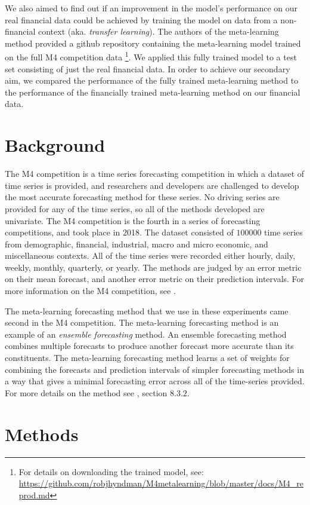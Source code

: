 \documentclass[a4paper,12pt]{article}
\theoremstyle{definition}
\begin{document}
We also aimed to find out if an improvement in the model's performance on our real financial data could be achieved by training the model on data from a non-financial context (aka. \textit{ transfer learning}). The authors of the meta-learning method provided a github repository containing the meta-learning model trained on the full M4 competition data \footnote{For details on downloading the trained model, see: \url{https://github.com/robjhyndman/M4metalearning/blob/master/docs/M4_reprod.md}}. We applied this fully trained model to a test set consisting of just the real financial data. In order to achieve our secondary aim, we compared the performance of the fully trained meta-learning method to the performance of the financially trained meta-learning method on our financial data.

\section{Background}
The M4 competition is a time series forecasting competition in which a dataset of time series is provided, and researchers and developers are challenged to develop the most accurate forecasting method for these series. No driving series are provided for any of the time series, so all of the methods developed are univariate. The M4 competition is the fourth in a series of forecasting competitions, and took place in 2018. The dataset consisted of $100000$ time series from demographic, financial, industrial, macro and micro economic, and miscellaneous contexts. All of the time series were recorded either hourly, daily, weekly, monthly, quarterly, or yearly. The methods are judged by an error metric on their mean forecast, and another error metric on their prediction intervals. For more information on the M4 competition, see \cite{m4}.

The meta-learning forecasting method that we use in these experiments came second in the M4 competition. The meta-learning forecasting method is an example of an \textit{ensemble forecasting} method. An ensemble forecasting method combines multiple forecasts to produce another forecast more accurate than its constituents. The meta-learning forecasting method learns a set of weights for combining the forecasts and prediction intervals of simpler forecasting methods in a way that gives a minimal forecasting error across all of the time-series provided. For more details on the method see \cite{lit}, section $8.3.2$.

\section{Methods}
\end{document}
